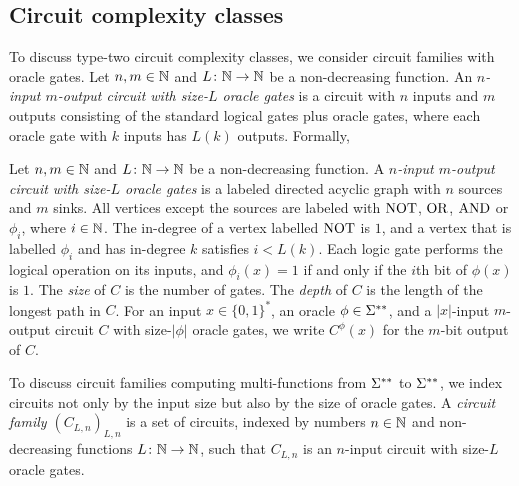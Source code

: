 \documentclass[envcountsect,envcountsame,orivec,oribibl]{llncs}
\begin{document}

\subsection{Circuit complexity classes}

To discuss type-two circuit complexity classes,
we consider circuit families with oracle gates.
Let $n, m \in \mathbb N$ and $L \colon \mathbb N \to \mathbb N$ be a non-decreasing function.
An \emph{$n$-input $m$-output circuit with size-$L$ oracle gates} is a circuit with
$n$ inputs and $m$ outputs consisting of the standard logical gates 
plus oracle gates, 
where each oracle gate with $k$ inputs has $L(k)$ outputs.
Formally, 

\begin{definition}
Let $n, m \in \mathbb N$ and $L \colon \mathbb N \to \mathbb N$ be a non-decreasing function.
A \emph{$n$-input $m$-output circuit with size-$L$ oracle gates} is 
a labeled directed acyclic graph with $n$ sources and $m$ sinks.
All vertices except the sources are labeled with $\mathrm{NOT}$, $\mathrm{OR}$, $\mathrm{AND}$ 
or $\phi _i$, where $i \in \mathbb N$.
The in-degree of a vertex labelled $\mathrm{NOT}$ is $1$, and
a vertex that is labelled $\phi _i$ and has in-degree $k$ 
satisfies $i < L(k)$.
Each logic gate performs the logical operation on its inputs, 
and $\phi_i(x) = 1$ if and only if the $i$th bit of $\phi(x)$ is $1$.
The \emph{size} of $C$ is the number of gates.
The \emph{depth} of $C$ is the length of the longest path in $C$.
For an input $x \in \{0, 1\}^*$, an oracle $\phi \in \Sigma ^{**}$, 
and a $|x|$-input $m$-output circuit $C$ with size-$|\phi|$ oracle gates, 
we write $C^\phi(x)$ for the $m$-bit output of $C$.
\end{definition}

To discuss circuit families computing multi-functions from $\Sigma ^{**}$ to $\Sigma ^{**}$,
we index circuits not only by the input size but also by the size of oracle gates.
A {\em circuit family $(C_{L,n})_{L,n}$} is a set of circuits, 
indexed by numbers $n \in \mathbb N$ and non-decreasing functions $L \colon \mathbb N \to \mathbb N$,
such that $C_{L, n}$ is an $n$-input circuit with size-$L$ oracle gates.
\end{document}
